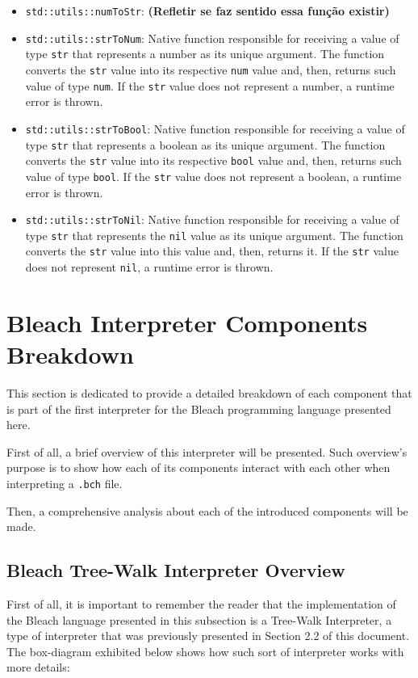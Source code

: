 \begin{itemize}
\begin{itemize}
            \item \texttt{std::utils::numToStr}: \textbf{(Refletir se faz sentido essa função existir)}
            
            \item \texttt{std::utils::strToNum}: Native function responsible for receiving a value of type \texttt{str} that represents a number as its unique argument. The function converts the \texttt{str} value into its respective \texttt{num} value and, then, returns such value of type \texttt{num}. If the \texttt{str} value does not represent a number, a runtime error is thrown.

            \item \texttt{std::utils::strToBool}: Native function responsible for receiving a value of type \texttt{str} that represents a boolean as its unique argument. The function converts the \texttt{str} value into its respective \texttt{bool} value and, then, returns such value of type \texttt{bool}. If the \texttt{str} value does not represent a boolean, a runtime error is thrown.

            \item \texttt{std::utils::strToNil}: Native function responsible for receiving a value of type \texttt{str} that represents the \texttt{nil} value as its unique argument. The function converts the \texttt{str} value into this value and, then, returns it. If the \texttt{str} value does not represent \texttt{nil}, a runtime error is thrown.
        \end{itemize}
\end{itemize}

\section{Bleach Interpreter Components Breakdown}
This section is dedicated to provide a detailed breakdown of each component that is part of the first interpreter for the Bleach programming language presented here.

First of all, a brief overview of this interpreter will be presented. Such overview's purpose is to show how each of its components interact with each other when interpreting a \texttt{.bch} file.

Then, a comprehensive analysis about each of the introduced components will be made.

\subsection{Bleach Tree-Walk Interpreter Overview}
First of all, it is important to remember the reader that the implementation of the Bleach language presented in this subsection is a Tree-Walk Interpreter, a type of interpreter that was previously presented in Section 2.2 of this document. The box-diagram exhibited below shows how such sort of interpreter works with more details:

